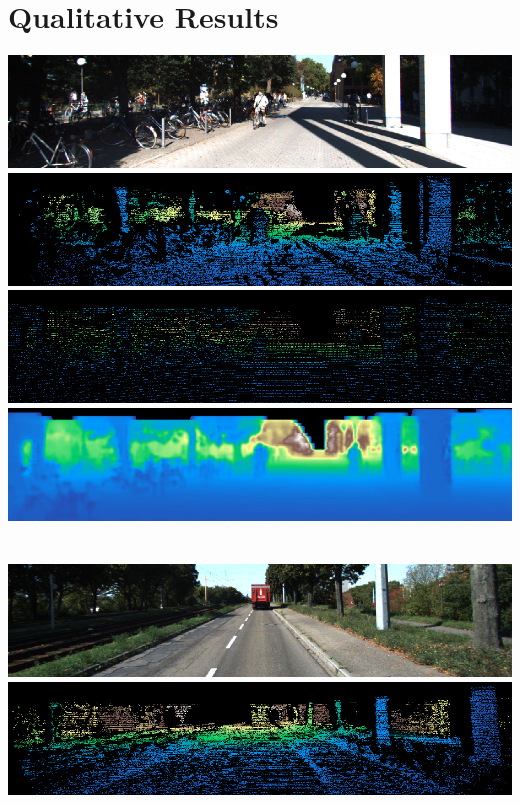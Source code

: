 \section{Qualitative Results}
\label{sec:qualitative-results}


\includegraphics[width=\textwidth]{visual_results/rgb1}\\
\includegraphics[width=\textwidth]{visual_results/ground1}\\
\includegraphics[width=\textwidth]{visual_results/input1}\\
\includegraphics[width=\textwidth]{visual_results/prediction1}\\\\\\\bigskip
\includegraphics[width=\textwidth]{visual_results/rgb2}\\
\includegraphics[width=\textwidth]{visual_results/ground2}\\
